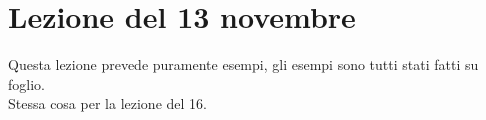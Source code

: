 \section{Lezione del 13 novembre}
Questa lezione prevede puramente esempi, gli esempi sono tutti stati fatti su foglio.\\
Stessa cosa per la lezione del 16.